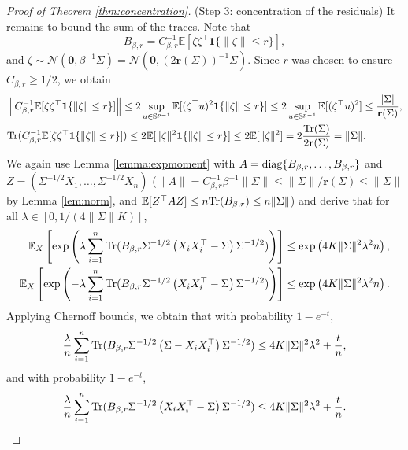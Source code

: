\documentclass[11pt,a4paper]{article}
\theoremstyle{remark}
\theoremstyle{definition}
\newcommand{\bX}{X}
\newcommand{\bZ}{Z}
\newcommand{\bu}{u}
\newcommand{\bzeta}{\zeta}
\newcommand{\bfA}{A}
\newcommand{\bfB}{B}
\newcommand{\bSigma}{\Sigma}
\newcommand{\bbS}{\mathbb{S}}
\newcommand{\E}{\mathbb{E}}
\newcommand{\Gauss}{\mathcal{N}}
\newcommand{\tr}{\textnormal{Tr}}
\newcommand{\diag}{\textnormal{diag}}
\newcommand{\zero}{\mathbf{0}}
\newcommand{\er}{\mathbf{r}}
\theoremstyle{definition}
\begin{document}
\begin{bibunit}[apalike]
\begin{proof}[Proof of Theorem \ref{thm:concentration}]
    (Step 3: concentration of the residuals) It remains to bound the sum of the traces.
    Note that
    \begin{equation*}
        \bfB_{\beta,r}=C_{\beta,r}^{-1}\E[\bzeta\bzeta^{\top}\mathbf{1}\{\|\bzeta\|\le r\}],
    \end{equation*}
    and $\bzeta\sim\Gauss(\zero,\beta^{-1}\bSigma)=\Gauss(\zero,(2\er(\bSigma))^{-1}\bSigma)$.
    Since $r$ was chosen to ensure $C_{\beta,r} \ge 1/2$,
    we obtain
    \begin{align*}
        &\left\|C_{\beta,r}^{-1}\E[\bzeta\bzeta^{\top}\mathbf{1}\{\|\bzeta\|\le r\}]\right\|\le 2\sup_{\bu\in\bbS^{p-1}}\E[(\bzeta^{\top}\bu)^{2}\mathbf{1}\{\|\bzeta\|\le r\}]\le 2\sup_{\bu\in\bbS^{p-1}}\E[(\bzeta^{\top}\bu)^{2}]\le \frac{\|\bSigma\|}{\er(\bSigma)},\\
        &\tr(C_{\beta,r}^{-1}\E[\bzeta\bzeta^{\top}\mathbf{1}\{\|\bzeta\|\le r\}])\le 2\E[\|\bzeta\|^{2}\mathbf{1}\{\|\bzeta\|\le r\}]\le 2\E[\|\bzeta\|^{2}]=2\frac{\tr(\bSigma)}{2\er(\bSigma)}=\|\bSigma\|.
    \end{align*}
    We again use Lemma \ref{lemma:expmoment} with $\bfA=\diag\{\bfB_{\beta,r},\ldots,\bfB_{\beta,r}\}$ and $ \bZ=(\bSigma^{-1/2}\bX_{1},\ldots,\bSigma^{-1/2}\bX_{n})$ ($\|\bfA\|=C_{\beta,r}^{-1}\beta^{-1}\|\bSigma\|\le \|\bSigma\|/\er(\bSigma)\le \|\bSigma\|$ by Lemma \ref{lem:norm}, and $\E[\bZ^{\top}\bfA\bZ]\le n\tr(\bfB_{\beta,r})\le n\|\bSigma\|$) and derive that for all $\lambda\in[0,1/(4\|\bSigma\|K)]$,
    \begin{align*}
        \E_{\bX}\left[\exp\left(\lambda\sum_{i=1}^{n}\tr(\bfB_{\beta,r}\bSigma^{-1/2}\left(\bX_{i}\bX_{i}^{\top}-\bSigma\right)\bSigma^{-1/2})\right)\right]&\le \exp\left(4K\|\bSigma\|^{2}\lambda^{2}n\right),\\
        \E_{\bX}\left[\exp\left(-\lambda\sum_{i=1}^{n}\tr(\bfB_{\beta,r}\bSigma^{-1/2}\left(\bX_{i}\bX_{i}^{\top}-\bSigma\right)\bSigma^{-1/2})\right)\right]&\le \exp\left(4K\|\bSigma\|^{2}\lambda^{2}n\right).
    \end{align*}
    Applying Chernoff bounds, we obtain that with probability $1-e^{-t}$,
    \begin{equation*}
        \frac{\lambda}{n}\sum_{i=1}^{n}\tr(\bfB_{\beta,r}\bSigma^{-1/2}\left(\bSigma-\bX_{i}\bX_{i}^{\top}\right)\bSigma^{-1/2})\le 4K\|\bSigma\|^{2}\lambda^{2}+\frac{t}{n},
    \end{equation*}
    and with probability $1-e^{-t}$,
    \begin{equation*}
        \frac{\lambda}{n}\sum_{i=1}^{n}\tr(\bfB_{\beta,r}\bSigma^{-1/2}\left(\bX_{i}\bX_{i}^{\top}-\bSigma\right)\bSigma^{-1/2})\le 4K\|\bSigma\|^{2}\lambda^{2}+\frac{t}{n}.
    \end{equation*}


\end{proof}
\end{bibunit}
\end{document}
